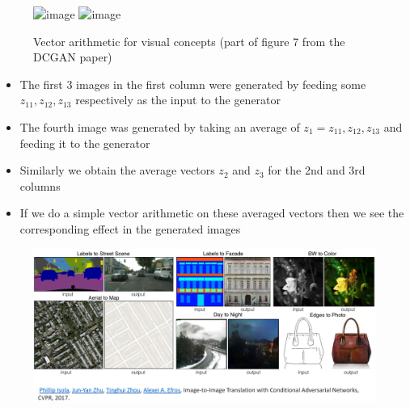 \begin{frame}
	\begin{figure}[h!]
		\includegraphics<1-4>[scale=0.40]{images/Smiling.png}
		\includegraphics<5->[scale=0.40]{images/Glasses.png}%
        \caption{Vector arithmetic for visual concepts (part of figure 7 from the DCGAN paper)}
	\end{figure}
	\begin{itemize}
		\item<1-> The first 3 images in the first column were generated by feeding some $z_{11}, z_{12}, z_{13}$ respectively as the input to the generator
		\item<2-> The fourth image was generated by taking an average of $z_1 = z_{11}, z_{12}, z_{13}$ and feeding it to the generator 
		\item<3-> Similarly we obtain the average vectors $z_2$ and $z_3$ for the 2nd and 3rd columns
		\item<4-> If we do a simple vector arithmetic on these averaged vectors then we see the corresponding effect in the generated images
	\end{itemize}
\end{frame}

\begin{frame}
	\begin{figure}[h!]
		\includegraphics[scale=0.20]{images/GAN_Applications.png}
	\end{figure}
\end{frame}

